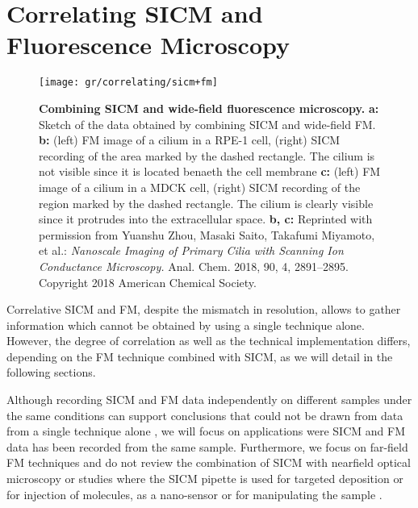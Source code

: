 \section{Correlating SICM and Fluorescence Microscopy}
\label{sec:correlating-sicm-and-fm}

\begin{figure}
  \texttt{[image: gr/correlating/sicm+fm]}
  \caption{%
    \textbf{Combining SICM and wide-field fluorescence microscopy.}
    \textbf{a:} Sketch of the data obtained by combining SICM and wide-field
    FM. 
    \textbf{b:} (left) FM image of a cilium in a RPE-1 cell, (right) SICM recording of
    the area marked by the dashed rectangle. The cilium is not visible since
    it is located benaeth the cell membrane \textbf{c:} (left) FM image of a
    cilium in a MDCK cell, (right) SICM recording of the
    region marked by the dashed rectangle. The cilium is clearly visible since
    it protrudes into the extracellular space.
    \textbf{b, c:} Reprinted with permission from Yuanshu Zhou, Masaki Saito,
    Takafumi Miyamoto, et al.: \emph{Nanoscale Imaging of Primary Cilia with
      Scanning Ion Conductance Microscopy.} Anal. Chem. 2018, 90, 4,
    2891–2895. Copyright 2018 American Chemical Society.
  }
  \label{fig:sicm+fm}
\end{figure}

Correlative SICM and FM, despite the mismatch in resolution, allows to gather
information which cannot be obtained by using a single technique
alone. However, the degree of correlation as well as the technical
implementation differs, depending on the FM technique combined with SICM, as
we will detail in the following sections.

Although recording SICM and FM data independently on different samples under
the same conditions can support conclusions that could not be drawn from data
from a single technique alone \cite{Gesper2017,Lee2013,Lyon2009}, we will
focus on applications were SICM and FM data has been recorded from the same
sample. Furthermore, we focus on far-field FM techniques and do not review the
combination of SICM with nearfield optical microscopy  
\cite{Korchev2000,Shevchuk2001,Rothery2003,Bruckbauer2002} or studies where
the SICM pipette is used for targeted deposition 
\cite{Ying2002,Bruckbauer2007,Bruckbauer2010,Hennig2015} or for injection 
\cite{Hennig2015a} of molecules, as a nano-sensor \cite{Piper2006} or for manipulating the sample
\cite{Fuentes2012,Wang2020}.

